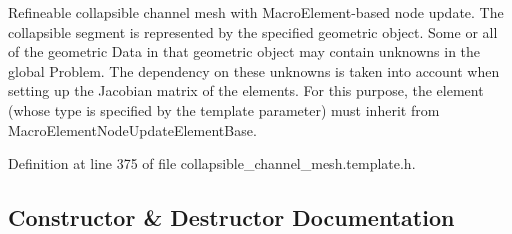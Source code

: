 Refineable collapsible channel mesh with Macro\+Element-\/based node update. The collapsible segment is represented by the specified geometric object. Some or all of the geometric Data in that geometric object may contain unknowns in the global Problem. The dependency on these unknowns is taken into account when setting up the Jacobian matrix of the elements. For this purpose, the element (whose type is specified by the template parameter) must inherit from Macro\+Element\+Node\+Update\+Element\+Base. 

Definition at line 375 of file collapsible\+\_\+channel\+\_\+mesh.\+template.\+h.



\subsection{Constructor \& Destructor Documentation}
\mbox{\label{classoomph_1_1MacroElementNodeUpdateRefineableCollapsibleChannelMesh_a6e3dfbb3d4dee7897d59aa10cde2dab1}} 
